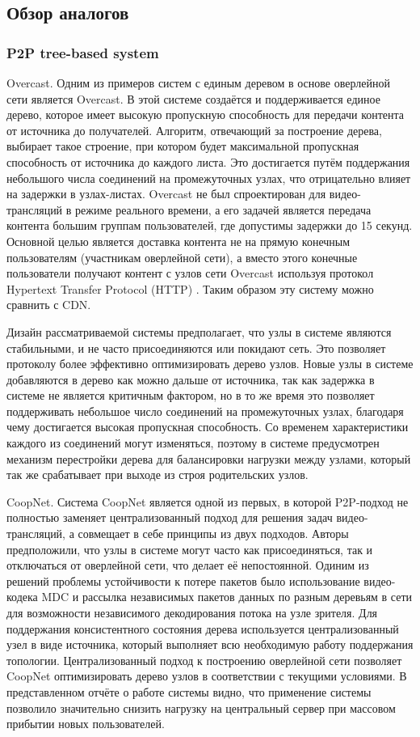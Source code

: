	\subsection{Обзор аналогов}
		\subsubsection{P2P tree-based system}

		Overcast. Одним из примеров систем с единым деревом в основе оверлейной сети является Overcast. В этой системе
		создаётся и поддерживается единое дерево, которое имеет высокую пропускную способность для передачи контента от
		источника до получателей. Алгоритм, отвечающий за построение дерева, выбирает такое строение, при котором будет
		максимальной пропускная способность от источника до каждого листа. Это достигается путём поддержания небольшого
		числа соединений на промежуточных узлах, что отрицательно влияет на задержки в узлах-листах. Overcast не был
		спроектирован для видео-трансляций в режиме реального времени, а его задачей является передача контента большим
		группам пользователей, где допустимы задержки до 15 секунд. Основной целью является доставка контента не на
		прямую конечным пользователям (участникам оверлейной сети), а вместо этого конечные пользователи получают
		контент с узлов сети Overcast используя протокол Hypertext Transfer Protocol (HTTP) \cite{2345234}. Таким
		образом эту систему можно сравнить с CDN.

		Дизайн рассматриваемой системы предполагает, что узлы в системе являются стабильными, и не часто присоединяются
		или покидают сеть. Это позволяет протоколу более эффективно оптимизировать дерево узлов. Новые узлы в системе
		добавляются в дерево как можно дальше от источника, так как задержка в системе не является критичным фактором,
		но в то же время это позволяет поддерживать небольшое число соединений на промежуточных узлах, благодаря чему
		достигается высокая пропускная способность. Со временем характеристики каждого из соединений могут изменяться,
		поэтому в системе предусмотрен механизм перестройки дерева для балансировки нагрузки между узлами, который так
		же срабатывает при выходе из строя родительских узлов.

		CoopNet. Система CoopNet является одной из первых, в которой P2P-подход не полностью заменяет централизованный подход
		для решения задач видео-трансляций, а совмещает в себе принципы из двух подходов. Авторы предположили, что
		узлы в системе могут часто как присоединяться, так и отключаться от оверлейной сети, что делает её непостоянной.
		Одиним из решений проблемы устойчивости к потере пакетов было использование видео-кодека MDC и рассылка
		независимых пакетов данных по разным деревьям в сети для возможности независимого декодирования потока на
		узле зрителя. Для поддержания консистентного состояния дерева используется централизованный узел в виде
		источника, который выполняет всю необходимую работу поддержания топологии. Централизованный подход к построению
		оверлейной сети позволяет CoopNet оптимизировать дерево узлов в соответствии с текущими условиями.
		В представленном отчёте о работе системы видно, что применение системы позволило значительно снизить нагрузку
		на центральный сервер при массовом прибытии новых пользователей.

